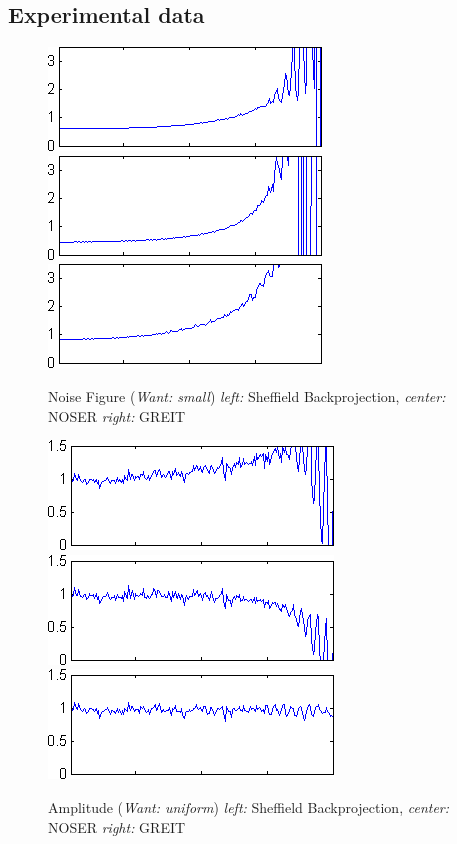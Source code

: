\documentclass[12pt]{iopart}
\begin{document}
\subsection{Experimental data}

\begin{figure}[bhtp]
\begin{center}
  \includegraphics[width= 0.3 \textwidth, bb=0 0 280 110]
{../../tutorial/GREIT-evaluation/simulation_test_imgs/simulation_test04_11.png}
  \includegraphics[width= 0.3 \textwidth, bb=0 0 280 110]
{../../tutorial/GREIT-evaluation/simulation_test_imgs/simulation_test04_21.png}
  \includegraphics[width= 0.3 \textwidth, bb=0 0 280 110]
{../../tutorial/GREIT-evaluation/simulation_test_imgs/simulation_test04_41.png}
\caption{ \label{fig:rimage}
Noise Figure ({\em Want: small})                        
{\em left:} Sheffield Backprojection,
{\em center:} NOSER
{\em right:} GREIT
}
\end{center}
\end{figure}

\begin{figure}[bhtp, bb=0 0 280 110]
\begin{center}
  \includegraphics[width= 0.3 \textwidth, bb=0 0 280 110]
{../../tutorial/GREIT-evaluation/simulation_test_imgs/simulation_test04_12.png}
  \includegraphics[width= 0.3 \textwidth, bb=0 0 280 110]
{../../tutorial/GREIT-evaluation/simulation_test_imgs/simulation_test04_22.png}
  \includegraphics[width= 0.3 \textwidth, bb=0 0 280 110]
{../../tutorial/GREIT-evaluation/simulation_test_imgs/simulation_test04_42.png}
\caption{ \label{fig:rimage}
Amplitude ({\em Want: uniform})
{\em left:} Sheffield Backprojection,
{\em center:} NOSER
{\em right:} GREIT
}
\end{center}
\end{figure}
\end{document}
